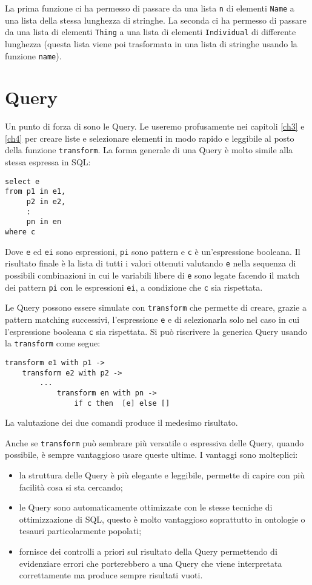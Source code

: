 La prima funzione ci ha permesso di passare da una lista \verb|n| di elementi \verb|Name| a una lista della stessa lunghezza di stringhe. La seconda ci ha permesso di passare da una lista di elementi \verb|Thing| a una lista di elementi \verb|Individual| di differente lunghezza (questa lista viene poi trasformata in una lista di stringhe usando la funzione \verb|name|).
\section{Query}
Un punto di forza di \cduce sono le Query. Le useremo profusamente nei capitoli \ref{ch3} e \ref{ch4} per creare liste e selezionare elementi in modo rapido e leggibile al posto della  funzione \verb|transform|.
La forma generale di una Query è molto simile alla stessa espressa in SQL:
\begin{verbatim}
select e 
from p1 in e1,
	 p2 in e2,
	 :
	 pn in en
where c
\end{verbatim}
Dove \verb|e| ed \verb|ei| sono espressioni, \verb|pi| sono pattern e \verb|c| è un'espressione booleana. Il risultato finale è la lista di tutti i valori ottenuti valutando \verb|e| nella sequenza di possibili combinazioni in cui le variabili libere di \verb|e| sono legate facendo il match dei pattern \verb|pi| con le espressioni \verb|ei|, a condizione che \verb|c| sia rispettata.

Le Query possono essere simulate con \verb|transform| che permette di creare, grazie a pattern matching successivi, l'espressione \verb|e| e di selezionarla solo nel caso in cui l'espressione booleana \verb|c| sia rispettata. Si può riscrivere la generica Query usando la \verb|transform| come segue:
\begin{verbatim}
transform e1 with p1 -> 
	transform e2 with p2 -> 
		...
			transform en with pn -> 
				if c then  [e] else []
\end{verbatim}
La valutazione dei due comandi produce il medesimo risultato.

Anche se \verb|transform| può sembrare più versatile o espressiva delle Query, quando possibile, è sempre vantaggioso usare queste ultime. I vantaggi sono molteplici:
\begin{itemize}
	\item la struttura delle Query è più elegante e leggibile, permette di capire con più facilità cosa si sta cercando;
	\item le Query sono automaticamente ottimizzate con le stesse tecniche di ottimizzazione di SQL, questo è molto vantaggioso soprattutto in ontologie o tesauri particolarmente popolati;
	\item \cduce fornisce dei controlli a priori sul risultato della Query permettendo di evidenziare errori che porterebbero a una Query che viene interpretata correttamente ma produce sempre risultati vuoti.
\end{itemize}


